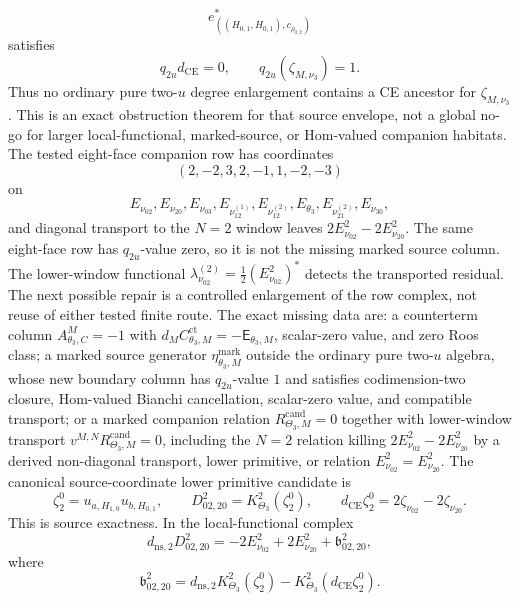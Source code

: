 \begin{stmt}
\begin{enumerate}[label=(\arabic*)]
\[      e^*_{((H_{0,1},H_{0,1}),c_{\rho_{0,2}})}
    \]
    satisfies
    \[
      q_{2u}d_{\mathrm{CE}}=0,\qquad
      q_{2u}(\zeta_{M,\nu_3})=1.
    \]
    Thus no ordinary pure two-\(u\) degree enlargement contains a CE
    ancestor for \(\zeta_{M,\nu_3}\).  This is an exact obstruction
    theorem for that source envelope, not a global no-go for larger
    local-functional, marked-source, or Hom-valued companion habitats.
    The tested eight-face companion row has
    coordinates
    \[
      (2,-2,3,2,-1,1,-2,-3)
    \]
    on
    \[
      E_{\nu_{02}},E_{\nu_{20}},E_{\nu_{03}},
      E_{\nu_{12}^{(1)}},E_{\nu_{12}^{(2)}},
      E_{\theta_3},E_{\nu_{21}^{(2)}},E_{\nu_{30}},
    \]
    and diagonal transport to the \(N=2\) window leaves
    \(2E^2_{\nu_{02}}-2E^2_{\nu_{20}}\).  The same eight-face row has
    \(q_{2u}\)-value zero, so it is not the missing marked source column.
    The lower-window functional
    \(\lambda^{(2)}_{\nu_{02}}=\frac12(E^2_{\nu_{02}})^*\) detects the
    transported residual.  The next possible repair is a controlled
    enlargement of the row complex, not reuse of either tested finite
    route.  The exact missing data are: a counterterm
    column \(A^M_{\theta_3,C}=-1\) with
    \(d_MC^{\mathrm{ct}}_{\theta_3,M}=-\mathsf E_{\theta_3,M}\),
    scalar-zero value, and zero Roos class; a marked source generator
    \(\eta^{\mathrm{mark}}_{\theta_3,M}\) outside the ordinary pure
    two-\(u\) algebra, whose new boundary column has
    \(q_{2u}\)-value \(1\) and satisfies codimension-two closure,
    Hom-valued Bianchi cancellation, scalar-zero value, and compatible
    transport; or a marked companion relation
    \(R^{\mathrm{cand}}_{\Theta_3,M}=0\) together with lower-window
    transport \(v^{M,N}R^{\mathrm{cand}}_{\Theta_3,M}=0\), including the
    \(N=2\) relation killing
    \(2E^2_{\nu_{02}}-2E^2_{\nu_{20}}\) by a derived non-diagonal
    transport, lower primitive, or relation
    \(E^2_{\nu_{02}}=E^2_{\nu_{20}}\).  The canonical source-coordinate
    lower primitive candidate is
    \[
      \zeta^0_2=u_{a,H_{1,0}}u_{b,H_{0,1}},\qquad
      D^2_{02,20}=K^2_{\Theta_3}(\zeta^0_2),
      \qquad
      d_{\mathrm{CE}}\zeta^0_2
      =
      2\zeta_{\nu_{02}}-2\zeta_{\nu_{20}}.
    \]
    This is source exactness.  In the local-functional complex
    \[
      d_{\mathrm{ns},2}D^2_{02,20}
      =
      -2E^2_{\nu_{02}}+2E^2_{\nu_{20}}
      +\mathfrak b^2_{02,20},
    \]
    where
    \[
      \mathfrak b^2_{02,20}
      =
      d_{\mathrm{ns},2}K^2_{\Theta_3}(\zeta^0_2)
      -
      K^2_{\Theta_3}(d_{\mathrm{CE}}\zeta^0_2).
\]
\end{enumerate}
\end{stmt}

